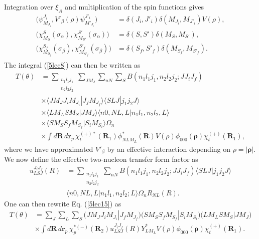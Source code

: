 Integration over $\xi_A$ and multiplication of the spin functions gives
\begin{equation}\label{5lec14}
\begin{split}
\bigl( \psi_{M_{J_i}}^{J_i},V'_\beta(\rho) \psi_{M'_{J_i}}^{J'_i}\bigr)&= \delta(J_i,J'_i)
\delta(M_{J_i},M_{J'_i})V(\rho),\\
\bigl( \chi_{M_S}^{S}(\sigma_\alpha),\chi_{M_{S'}}^{S'}(\sigma_\alpha)\bigr)&= \delta(S,S')
\delta(M_S,M_{S'}),\\
\bigl( \chi_{M_{S_f}}^{S_f}(\sigma_\beta),\chi_{M_{S'_f}}^{S'_f}(\sigma_\beta)\bigr)&= \delta(S_f,S'_f)
\delta(M_{S_f},M_{S'_f}).\\
\end{split}
\end{equation}
The integral (\ref{5lec8}) can then be written as
\begin{equation}\label{5lec15}
\begin{split}
T(\theta)&= \sum_{\substack{n_1 l_1 j_1\\n_2 l_2 j_2}}\sum_{J M_J}\sum_{nN}\sum_{S}B(n_1 l_1 j_1,n_2 l_2 j_2;JJ_i J_f)\\
&\times \langle J M_J J_i M_{J_i}|J_f M_{J_f} \rangle \langle SLJ|j_1 j_2 J \rangle \\
&\times \langle L M_L S M_{S}|J M_{J} \rangle \langle n0,NL,L|n_1 l_1,n_2 l_2,L \rangle \\
&\times \langle S M_S S_f M_{S_f}|S_i M_{S_i}\rangle \Omega_n \\
&\times \int d\mathbf R\,d\mathbf r_p\, \chi^{(+)*}_t(\mathbf R_1) \phi^*_{NLM_L}(\mathbf R) V(\rho) \phi_{000}(\pmb \rho) \chi^{(+)}_t(\mathbf R_1),
\end{split}
\end{equation}
where we have approximated $V'_\beta$ by an effective interaction depending on $\rho=|\pmb \rho|$.
We now define the effective two-nucleon transfer  form factor as
\begin{equation}\label{eqC7B15}
\begin{split}
u^{J_i J_f}_{LSJ}(R)&=\sum_{\substack{n_1 l_1 j_1\\n_2 l_2 j_2}}\sum_{nN} B(n_1 l_1 j_1,n_2 l_2 j_2;JJ_i J_f) \langle S L J|j_1 j_2 J\rangle\\
&\langle n0,NL,L|n_1 l_1,n_2 l_2;L \rangle \Omega_n R_{NL}(R).
\end{split}
\end{equation}
One can then rewrite Eq. (\ref{5lec15}) as
\begin{equation}\label{5lec17}
\begin{split}
T(\theta)&= \sum_J\sum_L\sum_S \bigl( J M_J J_i M_{J_i}|J_f M_{J_f} \bigr) \bigl( S M_S S_f M_{S_f}|S_i M_{S_i}\bigr)
 \bigl( L M_L S M_{S}|J M_{J} \bigr) \\
&\times \int d\mathbf R\,d\mathbf r_p\, \chi^{*(-)}_p(\mathbf R_2)
 u^{J_i J_f}_{LSJ}(R) Y_{L M_L}^*V(\rho) \phi_{000}(\pmb \rho) \chi^{(+)}_t(\mathbf R_1).
\end{split}
\end{equation}
